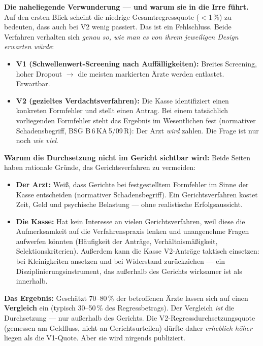 \documentclass{umbruch-position}
\begin{document}
\textbf{Die naheliegende Verwunderung --- und warum sie in die Irre führt.} Auf den ersten Blick scheint die niedrige Gesamtregressquote ($<$1\,\%) zu bedeuten, dass auch bei V2 wenig passiert. Das ist ein Fehlschluss. Beide Verfahren verhalten sich \textit{genau so, wie man es von ihrem jeweiligen Design erwarten würde}:

\begin{itemize}[nosep]
  \item \textbf{V1 (Schwellenwert-Screening nach Auffälligkeiten):} Breites Screening, hoher Dropout $\to$ die meisten markierten Ärzte werden entlastet. Erwartbar.
  \item \textbf{V2 (gezieltes Verdachtsverfahren):} Die Kasse identifiziert einen konkreten Formfehler und stellt einen Antrag. Bei einem tatsächlich vorliegenden Formfehler steht das Ergebnis im Wesentlichen fest (normativer Schadensbegriff, BSG B\,6\,KA\,5/09\,R): Der Arzt \textit{wird} zahlen. Die Frage ist nur noch \textit{wie viel}.
\end{itemize}

\textbf{Warum die Durchsetzung nicht im Gericht sichtbar wird:} Beide Seiten haben rationale Gründe, das Gerichtsverfahren zu vermeiden:

\begin{itemize}[nosep]
  \item \textbf{Der Arzt:} Weiß, dass Gerichte bei festgestelltem Formfehler im Sinne der Kasse entscheiden (normativer Schadensbegriff). Ein Gerichtsverfahren kostet Zeit, Geld und psychische Belastung --- ohne realistische Erfolgsaussicht.
  \item \textbf{Die Kasse:} Hat kein Interesse an vielen Gerichtsverfahren, weil diese die Aufmerksamkeit auf die Verfahrenspraxis lenken und unangenehme Fragen aufwerfen könnten (Häufigkeit der Anträge, Verhältnismäßigkeit, Selektionskriterien). Außerdem kann die Kasse V2-Anträge taktisch einsetzen: bei Kleinigkeiten ansetzen und bei Widerstand zurückziehen --- ein Disziplinierungsinstrument, das außerhalb des Gerichts wirksamer ist als innerhalb.
\end{itemize}

\textbf{Das Ergebnis:} Geschätzt 70--80\,\% der betroffenen Ärzte lassen sich auf einen \textbf{Vergleich} ein (typisch 30--50\,\% des Regressbetrags). Der Vergleich \textit{ist} die Durchsetzung --- nur außerhalb des Gerichts. Die V2-Regressdurchsetzungsquote (gemessen am Geldfluss, nicht an Gerichtsurteilen) dürfte daher \textit{erheblich höher} liegen als die V1-Quote. Aber sie wird nirgends publiziert.
\end{document}

